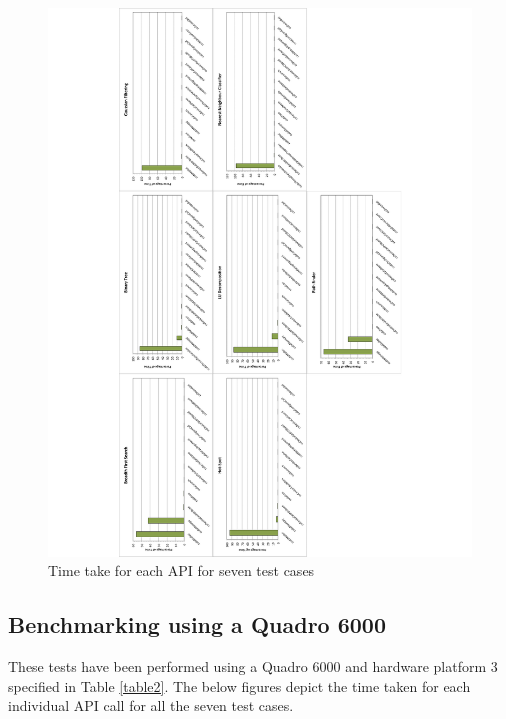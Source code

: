 \documentclass[paper=a4, fontsize=11pt]{scrartcl}
\numberwithin{equation}{section}		%
\numberwithin{figure}{section}			%
\numberwithin{table}{section}				%
\begin{document}
\begin{figure}[!h]
\centering
\includegraphics[scale=0.6]{../imgs/x650.pdf}
\caption{Time take for each API for seven test cases}
\label{fig:x650}
\end{figure}

\newpage
\subsection{Benchmarking using a Quadro 6000}
These tests have been performed using a Quadro 6000 and hardware platform 3 specified in Table \ref{table2}. The below figures depict the time taken for each individual API call for all the seven test cases.
\end{document}
